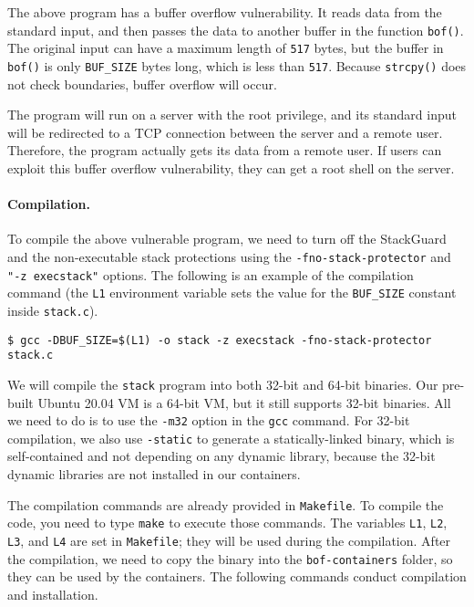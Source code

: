The above program has a buffer overflow vulnerability. It 
reads data from the standard input, and then passes the data
to another buffer in the function {\tt bof()}. The 
original input can have a maximum length of \texttt{517} bytes, but the buffer
in {\tt bof()} is only \texttt{BUF\_SIZE} bytes long, which is less than
\texttt{517}. Because {\tt strcpy()} does not check boundaries, 
buffer overflow will occur.

The program will run on a server with the root privilege, and its 
standard input will be redirected to a TCP connection between the
server and a remote user. 
Therefore, the program actually gets its data from a remote user. 
If users can exploit this buffer overflow vulnerability, 
they can get a root shell on the server. 


\paragraph{Compilation.}
To compile the above vulnerable program, we need to 
turn off the StackGuard and the non-executable stack protections 
using the \texttt{-fno-stack-protector} and \texttt{"-z execstack"} options.
The following is an example of the compilation command (the \texttt{L1} environment 
variable sets the value for the \texttt{BUF\_SIZE} constant inside \texttt{stack.c}).   

\begin{lstlisting}
$ gcc -DBUF_SIZE=$(L1) -o stack -z execstack -fno-stack-protector stack.c
\end{lstlisting}

We will compile the \texttt{stack} program into both 32-bit and 64-bit 
binaries. Our pre-built Ubuntu 20.04 VM is a 64-bit VM, but it 
still supports 32-bit binaries. All we need to do is to 
use the \texttt{-m32} option in the \texttt{gcc} command. 
For 32-bit compilation, we also use \texttt{-static} to generate 
a statically-linked binary, which is self-contained and not depending
on any dynamic library, because the 32-bit dynamic libraries 
are not installed in our containers. 


The compilation commands are already provided in \texttt{Makefile}. To compile
the code, you need to type \texttt{make} to execute those commands.
The variables \texttt{L1}, \texttt{L2}, \texttt{L3}, and \texttt{L4} are
set in \texttt{Makefile}; they will be used during the compilation.
After the compilation, we need to copy the binary into
the \texttt{bof-containers} folder, so they can be used by the 
containers. The following commands conduct compilation and 
installation.

